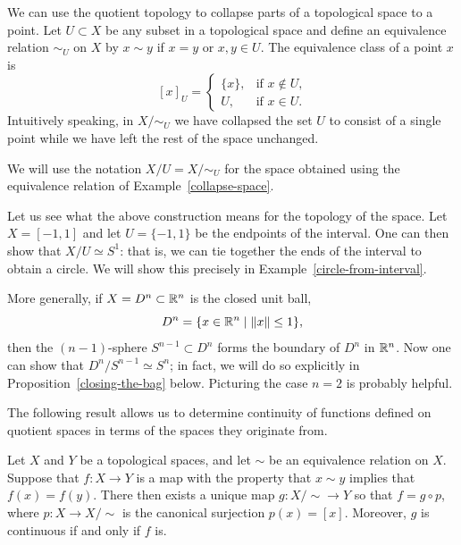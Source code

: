 \begin{example}
  \label{collapse-space}
  We can use the quotient topology to collapse parts of a topological space to a point. Let $U \subset X$ be any subset in a topological space and define an equivalence relation $\sim_U$ on $X$ by $x \sim y$ if $x = y$ or $x,y \in U$. The equivalence class of a point $x$ is
  \[
    [x]_U = \begin{cases} \{x\},& \text{if $x \notin U$,} \\ U,& \text{if $x \in U$.} \end{cases}
  \]
  Intuitively speaking, in $X/\!\sim_U$ we have collapsed the set $U$ to consist of a single point while we have left the rest of the space unchanged.
\end{example}
We will use the notation $X/U = X/\!\sim_U$ for the space obtained using the equivalence relation of Example~\ref{collapse-space}.
\begin{example}
  \label{bag-closing-example}
  Let us see what the above construction means for the topology of the space. Let $X = [-1,1]$ and let $U = \{-1,1\}$ be the endpoints of the interval. One can then show that $X/U \simeq S^1$: that is, we can tie together the ends of the interval to obtain a circle. We will show this precisely in Example~\ref{circle-from-interval}.
  
  More generally, if $X = D^n \subset \mathbb{R}^n$ is the closed unit ball, 
  \[
    D^n = \{x \in \mathbb{R}^n \mid \lVert x \rVert \leq 1 \},
  \]
  then the $(n-1)$-sphere $S^{n-1} \subset D^n$ forms the boundary of $D^n$ in $\mathbb{R}^n$. Now one can show that $D^n/S^{n-1} \simeq S^n$; in fact, we will do so explicitly in Proposition~\ref{closing-the-bag} below. Picturing the case $n = 2$ is probably helpful.
\end{example}
The following result allows us to determine continuity of functions defined on quotient spaces in terms of the spaces they originate from.
\begin{lem}
  \label{universal-property-quotients}
  Let $X$ and $Y$ be a topological spaces, and let $\sim$ be an equivalence relation on $X$. Suppose that $f : X \to Y$ is a map with the property that $x \sim y$ implies that $f(x) = f(y)$. There then exists a unique map $g : X /\!\sim \to Y$ so that $f = g \circ p$, where $p : X \to X/\!\sim$ is the canonical surjection $p(x) = [x]$. Moreover, $g$ is continuous if and only if $f$ is.
\end{lem}
